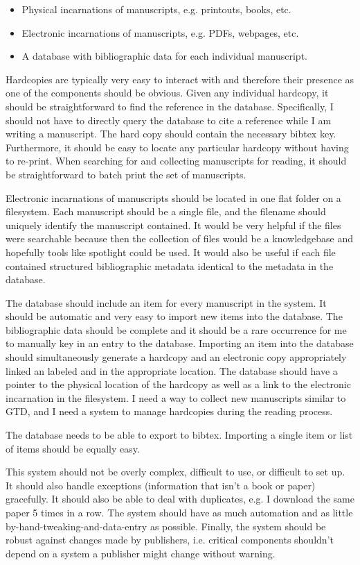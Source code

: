 \documentclass[letterpaper,12pt]{article}
\begin{document}
\begin{itemize}
\item Physical incarnations of manuscripts, e.g. printouts, books, etc.
\item Electronic incarnations of manuscripts, e.g. PDFs, webpages, etc.
\item A database with bibliographic data for each individual manuscript.
\end{itemize}

Hardcopies are typically very easy to interact with and therefore their presence as one of the components should be obvious. Given any individual hardcopy, it should be straightforward to find the reference in the database. Specifically, I should not have to directly query the database to cite a reference while I am writing a manuscript. The hard copy should contain the necessary bibtex key. Furthermore, it should be easy to locate any particular hardcopy without having to re-print. When searching for and collecting manuscripts for reading, it should be straightforward to batch print the set of manuscripts.

Electronic incarnations of manuscripts should be located in one flat folder on a filesystem. Each manuscript should be a single file, and the filename should uniquely identify the manuscript contained. It would be very helpful if the files were searchable because then the collection of files would be a knowledgebase and hopefully tools like spotlight could be used. It would also be useful if each file contained structured bibliographic metadata identical to the metadata in the database.

The database should include an item for every manuscript in the system. It should be automatic and very easy to import new items into the database. The bibliographic data should be complete and it should be a rare occurrence for me to manually key in an entry to the database. Importing an item into the database should simultaneously generate a hardcopy and an electronic copy appropriately linked an labeled and in the appropriate location. The database should have a pointer to the physical location of the hardcopy as well as a link to the electronic incarnation in the filesystem. I need a way to collect new manuscripts similar to GTD, and I need a system to manage hardcopies during the reading process.

 The database needs to be able to export to bibtex. Importing a single item or list of items should be equally easy. 

This system should not be overly complex, difficult to use, or difficult to set up. It should also handle exceptions (information that isn't a book or paper) gracefully. It should also be able to deal with duplicates, e.g. I download the same paper 5 times in a row. The system should have as much automation and as little by-hand-tweaking-and-data-entry as possible. Finally, the system should be robust against changes made by publishers, i.e. critical components shouldn't depend on a system a publisher might change without warning.
\end{document}
